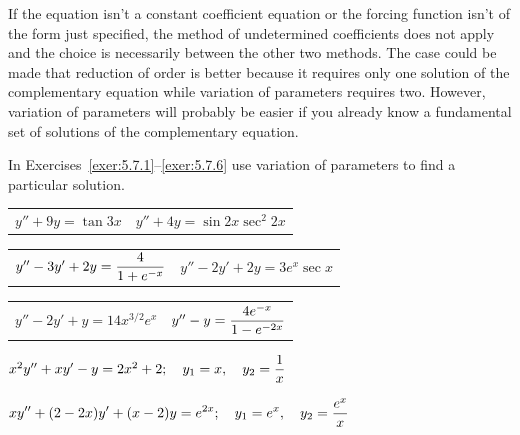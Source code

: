 If the equation isn't a constant coefficient equation or the forcing function isn't of the form just
specified, the method of undetermined coefficients does not apply and the choice is necessarily
between the other two methods. The case could be made that reduction of order is better because it
requires only one solution of the complementary equation while variation of parameters requires two.
However, variation of parameters will probably be easier if you already know a fundamental set of
solutions of the complementary equation.

\exercises In Exercises~\ref{exer:5.7.1}--\ref{exer:5.7.6} use variation of parameters to find a particular solution.

\begin{exerciselist}
  \begin{tabular}[t]{@{}p{168pt}@{}p{168pt}}
    \item\label{exer:5.7.1} $y''+9y=\tan3x$ & \vspace*{10pt}
    \item\label{exer:5.7.2} $y''+4y=\sin2x\sec^{2}2x$
  \end{tabular}

  \begin{tabular}[t]{@{}p{168pt}@{}p{168pt}}
    \item\label{exer:5.7.3} $y''-3y'+2y=\displaystyle\frac{4}{1+e^{-x}}$ &
    \item\label{exer:5.7.4} $y''-2y'+2y=3e^{x}\sec x$
  \end{tabular}

  \begin{tabular}[t]{@{}p{168pt}@{}p{168pt}}
    \item\label{exer:5.7.5} $y''-2y'+y=14x^{3/2}e^{x}$ & \vspace*{-5pt}
    \item\label{exer:5.7.6} $y''-y=\displaystyle\frac{4e^{-x}}{1-e^{-2x}}$
  \end{tabular}


  \item\label{exer:5.7.7} $x^{2}y''+xy'-y=2x^{2}+2;\quad y_{1}=x, \quad y_{2}=\displaystyle\frac{1}{x}$

  \item\label{exer:5.7.8}
        $\displaystyle{xy''+(2-2x)y'+(x-2)y=e^{2x};\quad y_{1}=e^{x}, \quad y_{2}=\frac{e^{x}}{x}}$


\end{exerciselist}
